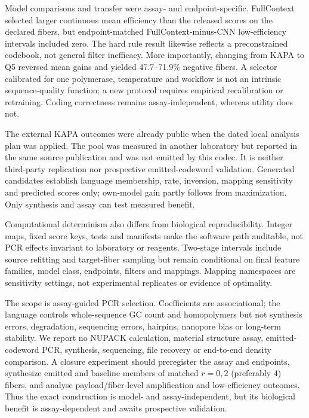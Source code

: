 \documentclass[10pt]{article}
\begin{document}
Model comparisons and transfer were assay- and endpoint-specific. FullContext selected larger continuous mean efficiency than the released scores on the declared fibers, but endpoint-matched FullContext-minus-CNN low-efficiency intervals included zero. The hard rule result likewise reflects a preconstrained codebook, not general filter inefficacy. More importantly, changing from KAPA to Q5 reversed mean gains and yielded 47.7--71.9\% negative fibers. A selector calibrated for one polymerase, temperature and workflow is not an intrinsic sequence-quality function; a new protocol requires empirical recalibration or retraining. Coding correctness remains assay-independent, whereas utility does not.

The external KAPA outcomes were already public when the dated local analysis plan was applied. The pool was measured in another laboratory but reported in the same source publication and was not emitted by this codec. It is neither third-party replication nor prospective emitted-codeword validation. Generated candidates establish language membership, rate, inversion, mapping sensitivity and predicted scores only; own-model gain partly follows from maximization. Only synthesis and assay can test measured benefit.

Computational determinism also differs from biological reproducibility. Integer maps, fixed score keys, tests and manifests make the software path auditable, not PCR effects invariant to laboratory or reagents. Two-stage intervals include source refitting and target-fiber sampling but remain conditional on final feature families, model class, endpoints, filters and mappings. Mapping namespaces are sensitivity settings, not experimental replicates or evidence of optimality.

The scope is assay-guided PCR selection. Coefficients are associational; the language controls whole-sequence GC count and homopolymers but not synthesis errors, degradation, sequencing errors, hairpins, nanopore bias or long-term stability. We report no NUPACK calculation, material structure assay, emitted-codeword PCR, synthesis, sequencing, file recovery or end-to-end density comparison. A closure experiment should preregister the assay and endpoints, synthesize emitted and baseline members of matched $r=0,2$ (preferably $4$) fibers, and analyse payload/fiber-level amplification and low-efficiency outcomes. Thus the exact construction is model- and assay-independent, but its biological benefit is assay-dependent and awaits prospective validation.
\end{document}
